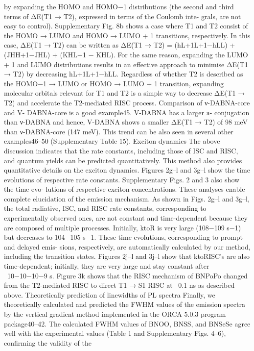 by expanding the HOMO and HOMO−1 distributions (the second and
third terms of ΔE(T1 → T2), expressed in terms of the Coulomb inte-
grals, are not easy to control). Supplementary Fig. 8b shows a case
where T1 and T2 consist of the HOMO → LUMO and HOMO → LUMO + 1
transitions, respectively. In this case, ΔE(T1 → T2) can be written as
ΔE(T1 → T2) = (hL+1L+1−hLL) + (JHH+1−JHL) + (KHL+1 − KHL).
For
the
same
reason, expanding the LUMO + 1 and LUMO distributions results in an
effective approach to minimise ΔE(T1 → T2) by decreasing hL+1L+1−hLL.
Regardless of whether T2 is described as the HOMO−1 → LUMO or
HOMO → LUMO + 1 transition, expanding molecular orbitals relevant
for T1 and T2 is a simple way to decrease ΔE(T1 → T2) and accelerate the
T2-mediated RISC process. Comparison of ν-DABNA-core and V-
DABNA-core
is
a
good
example45.
V-DABNA
has
a
larger
π-
conjugation than ν-DABNA and hence, V-DABNA shows a smaller
ΔE(T1 → T2) of 98 meV than ν-DABNA-core (147 meV). This trend can be
also seen in several other examples46–50 (Supplementary Table 15).
Exciton dynamics
The above discussion indicates that the rate constants, including those
of ISC and RISC, and quantum yields can be predicted quantitatively.
This method also provides quantitative details on the exciton
dynamics. Figures 2g–l and 3g–l show the time evolutions of respective
rate constants. Supplementary Figs. 2 and 3 also show the time evo-
lutions of respective exciton concentrations. These analyses enable
complete elucidation of the emission mechanism. As shown in
Figs. 2g–l and 3g–l, the total radiative, ISC, and RISC rate constants,
corresponding to experimentally observed ones, are not constant and
time-dependent because they are composed of multiple processes.
Initially, ktoR is very large (108−109 s−1) but decreases to 104−105 s−1.
These time evolutions, corresponding to prompt and delayed emis-
sions, respectively, are automatically calculated by our method,
including the transition states. Figures 2j–l and 3j–l show that ktoRISC’s
are also time-dependent; initially, they are very large and stay constant
after ~10−10−10−9 s. Figure 3k shows that the RISC mechanism of
BNPoPo changed from the T2-mediated RISC to direct T1 → S1 RISC at
~0.1 ns as described above.
Theoretically prediction of linewidths of PL spectra
Finally, we theoretically calculated and predicted the FWHM values of
the emission spectra by the vertical gradient method implemented in
the ORCA 5.0.3 program package40–42. The calculated FWHM values of
BNOO, BNSS, and BNSeSe agree well with the experimental values
(Table 1 and Supplementary Figs. 4–6), conﬁrming the validity of the
